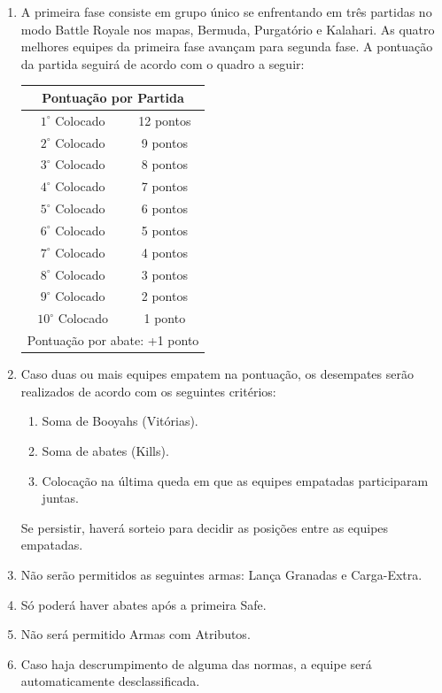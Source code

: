 \begin{enumerate}[start=1,label={\bfseries Art. \arabic*$^\circ$ - }, resume]

    \item A primeira fase consiste em grupo único se enfrentando em três partidas no modo
    Battle Royale nos mapas, Bermuda, Purgatório e Kalahari.
    As quatro melhores equipes da primeira fase avançam para
    segunda fase. A pontuação da partida seguirá de acordo com o quadro
    a seguir:

    \begin{center}
        \begin{tabular}{c c}
            \hline
            \multicolumn{2}{c}{Pontuação por Partida}\\
            \hline
            $1^\circ$  Colocado & 12 pontos \\
            $2^\circ$  Colocado & 9 pontos \\
            $3^\circ$  Colocado & 8 pontos \\
            $4^\circ$  Colocado & 7 pontos \\
            $5^\circ$  Colocado & 6 pontos \\
            $6^\circ$  Colocado & 5 pontos \\
            $7^\circ$  Colocado & 4 pontos \\
            $8^\circ$  Colocado & 3 pontos \\
            $9^\circ$  Colocado & 2 pontos \\
            $10^\circ$ Colocado & 1 ponto \\
            \hline
            \multicolumn{2}{c}{Pontuação por abate: +1 ponto}\\
        \end{tabular}
    \end{center}

    \item Caso duas ou mais equipes empatem na pontuação, os desempates
    serão realizados de acordo com os seguintes critérios:

    \begin{enumerate}[label={\bfseries \Roman* - }]
        \item Soma de Booyahs (Vitórias).
        \item Soma de abates (Kills).
        \item Colocação na última queda em que as equipes empatadas
            participaram juntas.
    \end{enumerate}

    Se persistir, haverá sorteio para decidir as posições entre as equipes
    empatadas.

    \item Não serão permitidos as seguintes armas: Lança Granadas e Carga-Extra.
    \item Só poderá haver abates após a primeira Safe.
    \item Não será permitido Armas com Atributos.
    \item  Caso haja descrumpimento de alguma das normas, a equipe será automaticamente desclassificada.
\end{enumerate}

